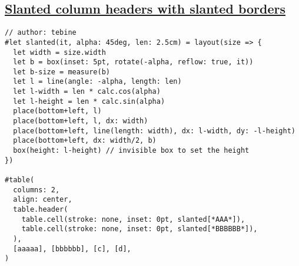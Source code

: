 \pandocbounded{}

\subsection{\texorpdfstring{\hyperref[slanted-column-headers-with-slanted-borders]{Slanted
column headers with slanted
borders}}{Slanted column headers with slanted borders}}\label{slanted-column-headers-with-slanted-borders}

\begin{verbatim}
// author: tebine
#let slanted(it, alpha: 45deg, len: 2.5cm) = layout(size => {
  let width = size.width
  let b = box(inset: 5pt, rotate(-alpha, reflow: true, it))
  let b-size = measure(b)
  let l = line(angle: -alpha, length: len)
  let l-width = len * calc.cos(alpha)
  let l-height = len * calc.sin(alpha)
  place(bottom+left, l)
  place(bottom+left, l, dx: width)
  place(bottom+left, line(length: width), dx: l-width, dy: -l-height)
  place(bottom+left, dx: width/2, b)
  box(height: l-height) // invisible box to set the height
})

#table(
  columns: 2,
  align: center,
  table.header(
    table.cell(stroke: none, inset: 0pt, slanted[*AAA*]),
    table.cell(stroke: none, inset: 0pt, slanted[*BBBBBB*]),
  ),
  [aaaaa], [bbbbbb], [c], [d],
)
\end{verbatim}

\pandocbounded{}
